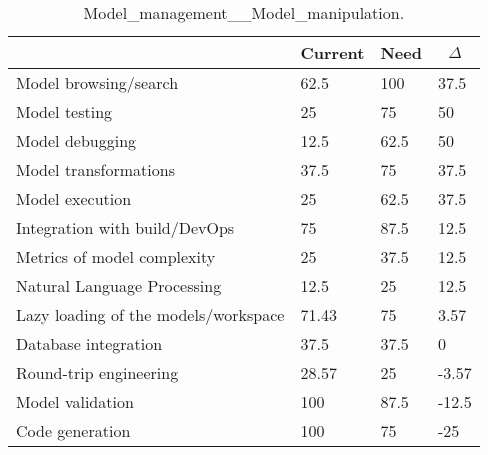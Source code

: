 
  \begin{table*}[]
  \centering
  \notsotiny
  \caption{ Model_management__Model_manipulation.}
\label{tab:model_management__model_manipulation}
\begin{tabular}{|l|l|l|l|}
  \hline
  \rowcolor[HTML]{C0C0C0}
    \multicolumn{1}{|c|}{Feature} & \multicolumn{1}{c|}{Current} & \multicolumn{1}{c|}{Need} & \multicolumn{1}{c|}{$\Delta$} \\ \hline
  Model browsing/search & 62.5 & 100 & 37.5 \\ \hline 
Model testing & 25 & 75 & 50 \\ \hline 
Model debugging & 12.5 & 62.5 & 50 \\ \hline 
Model transformations & 37.5 & 75 & 37.5 \\ \hline 
Model execution & 25 & 62.5 & 37.5 \\ \hline 
Integration with build/DevOps & 75 & 87.5 & 12.5 \\ \hline 
Metrics of model complexity & 25 & 37.5 & 12.5 \\ \hline 
Natural Language Processing & 12.5 & 25 & 12.5 \\ \hline 
Lazy loading of the models/workspace & 71.43 & 75 & 3.57 \\ \hline 
Database integration & 37.5 & 37.5 & 0 \\ \hline 
Round-trip engineering & 28.57 & 25 & -3.57 \\ \hline 
Model validation & 100 & 87.5 & -12.5 \\ \hline 
Code generation & 100 & 75 & -25 \\ \hline 
\end{tabular}%
  \end{table*}